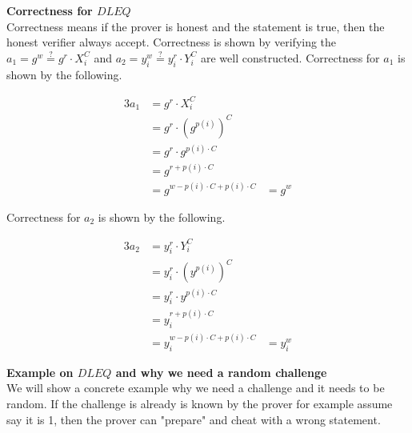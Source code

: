 \noindent
\textbf{Correctness for $DLEQ$}\\
Correctness means if the prover is honest and the statement is true, then the honest verifier always accept. Correctness is shown by verifying the $a_1=g^w \stackrel{?}{=} g^r \cdot X_i^C$ and $a_2=y_i^w \stackrel{?}{=} y_i^r \cdot Y_i^C$ are well constructed. Correctness for $a_1$ is shown by the following.



\begin{alignat*}{3}
a_1 &= g^r \cdot X_i^C \\
&= g^r \cdot (g^{p(i)})^C \\
&= g^r \cdot g^{p(i) \cdot C}\\
&=g^{r+p(i) \cdot C}      \\
&= g^{w - p(i) \cdot C + p(i) \cdot C} &= g^w
\end{alignat*}


\noindent
Correctness for $a_2$ is shown by the following.


\begin{alignat*}{3}
a_2 &= y_i^r \cdot Y_i^C\\
&= y_i^r \cdot (y^{p(i)})^C \\
&= y_i^r \cdot y^{p(i) \cdot C}\\
&=y_i^{r+p(i) \cdot C}      \\
&= y_i^{w - p(i) \cdot C + p(i) \cdot C} &= y_i^w
\end{alignat*}



\noindent
\textbf{Example on $DLEQ$ and why we need a random challenge}\\
We will show a concrete example why we need a challenge and it needs to be random. If the challenge is already is known by the prover for example  assume say it is 1, then the prover can "prepare" and cheat with a wrong statement. 


